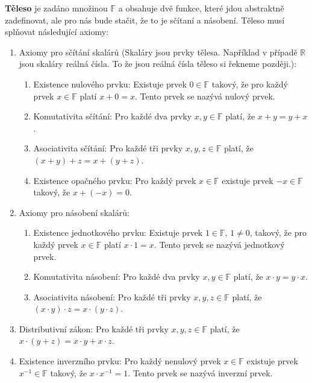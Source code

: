\begin{definitionbox}
  \textbf{Těleso} je zadáno množinou $\mathbb{F}$ a obsahuje dvě funkce, které jdou abstraktně zadefinovat, ale pro nás bude stačit, že to je sčítaní a násobení. Těleso musí splňovat následující axiomy:

  \begin{enumerate}
    \item Axiomy pro sčítání skalárů (Skaláry jsou prvky tělesa. Například v případě $\mathbb{R}$ jsou skaláry reálná čísla. To že jsou reálná čísla těleso si řekneme později.):
    \begin{enumerate}
      \item Existence nulového prvku: Existuje prvek $0\in\mathbb{F}$ takový, že pro každý prvek $x\in\mathbb{F}$ platí $x + 0 = x$. Tento prvek se nazývá nulový prvek.
      \item Komutativita sčítání: Pro každé dva prvky $x, y\in\mathbb{F}$ platí, že $x + y = y + x$.
      \item Asociativita sčítání: Pro každé tři prvky $x, y, z\in\mathbb{F}$ platí, že $(x + y) + z = x + (y + z)$.
      \item Existence opačného prvku: Pro každý prvek $x\in\mathbb{F}$ existuje prvek $-x\in\mathbb{F}$ takový, že $x + (-x) = 0$.
    \end{enumerate}
    \item Axiomy pro násobení skalárů:
    \begin{enumerate}
      \item Existence jednotkového prvku: Existuje prvek $1\in\mathbb{F}$, $1\neq 0$, takový, že pro každý prvek $x\in\mathbb{F}$ platí $x\cdot 1 = x$. Tento prvek se nazývá jednotkový prvek.
      \item Komutativita násobení: Pro každé dva prvky $x, y\in\mathbb{F}$ platí, že $x\cdot y = y\cdot x$.
      \item Asociativita násobení: Pro každé tři prvky $x, y, z\in\mathbb{F}$ platí, že $(x\cdot y)\cdot z = x\cdot (y\cdot z)$.
    \end{enumerate}
    \item Distributivní zákon: Pro každé tři prvky $x, y, z\in\mathbb{F}$ platí, že $x\cdot (y + z) = x\cdot y + x\cdot z$.
    \item Existence inverzního prvku: Pro každý nenulový prvek $x\in\mathbb{F}$ existuje prvek $x^{-1}\in\mathbb{F}$ takový, že $x\cdot x^{-1} = 1$. Tento prvek se nazývá inverzní prvek.
  \end{enumerate}
  

\end{definitionbox}

